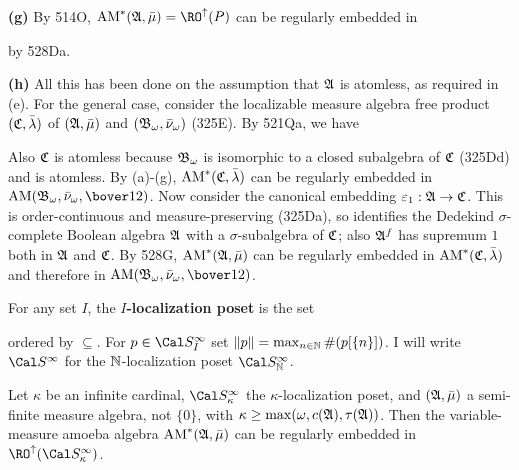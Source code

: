 {\medskip

{\bf (g)} By 514O, $\AM^*(\frak A,\bar\mu)=\RO^{\uparrow}(P)$ can be
regularly embedded in


\noindent by 528Da.

\medskip

{\bf (h)} All this has been done on the assumption that $\frak A$ is
atomless, as required in (e).   For the general case, consider the
localizable measure algebra free product
$(\frak C,\bar\lambda)$ of $(\frak A,\bar\mu)$ and
$(\frak B_{\omega},\bar\nu_{\omega})$ (325E).   By 521Qa, we have


\noindent Also $\frak C$ is atomless because $\frak B_{\omega}$ is
isomorphic to a closed subalgebra of $\frak C$ (325Dd) and is atomless.
By (a)-(g), $\mathop{\text{AM}}^*(\frak C,\bar\lambda)$ can be regularly embedded in
$\AM(\frak B_{\omega},\bar\nu_{\omega},\bover12)$.   Now consider the
canonical embedding $\varepsilon_1:\frak A\to\frak C$.
This is order-continuous and measure-preserving (325Da), so identifies the
Dedekind $\sigma$-complete Boolean algebra $\frak A$ with a
$\sigma$-subalgebra of $\frak C$;  also $\frak A^f$ has supremum $1$ both
in $\frak A$ and $\frak C$.   By 528G, $\mathop{\text{AM}}^*(\frak A,\bar\mu)$ can be
regularly embedded in $\mathop{\text{AM}}^*(\frak C,\bar\lambda)$ and therefore in
$\AM(\frak B_{\omega},\bar\nu_{\omega},\bover12)$.
}%

 For any set $I$, the
{\bf $I$-localization poset} is the set


\noindent ordered by $\subseteq$.   For $p\in\Cal S_I^{\infty}$ set
$\|p\|=\max_{n\in\Bbb N}\#(p[\{n\}])$.    I will write $\Cal S^{\infty}$
for the $\Bbb N$-localization poset $\Cal S^{\infty}_{\Bbb N}$.

 Let $\kappa$ be an infinite cardinal,
$\Cal S_{\kappa}^{\infty}$ the $\kappa$-localization poset,
and $(\frak A,\bar\mu)$ a
semi-finite measure algebra, not $\{0\}$, with
$\kappa\ge\max(\omega,c(\frak A),\tau(\frak A))$.
Then the variable-measure amoeba algebra
$\mathop{\text{AM}}^*(\frak A,\bar\mu)$ can be regularly embedded in
$\RO^{\uparrow}(\Cal S_{\kappa}^{\infty})$.

